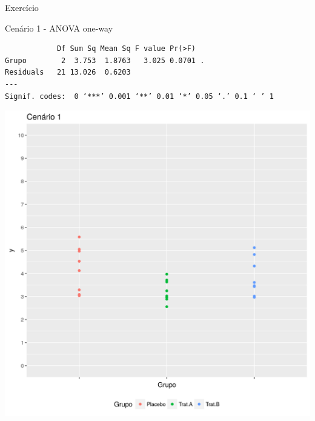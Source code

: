 \documentclass{beamer}
\begin{document}
\begin{frame}[fragile]{Exercício}
  \begin{exampleblock}{Cenário 1 - ANOVA one-way}
    \tiny
\begin{verbatim}
            Df Sum Sq Mean Sq F value Pr(>F)  
Grupo        2  3.753  1.8763   3.025 0.0701 .
Residuals   21 13.026  0.6203                 
---
Signif. codes:  0 ‘***’ 0.001 ‘**’ 0.01 ‘*’ 0.05 ‘.’ 0.1 ‘ ’ 1
\end{verbatim}
    \begin{center}
      \includegraphics[height=.5\textheight]{Cap13-30/cenario1}
    \end{center}
  \end{exampleblock}
\end{frame}
\end{document}
